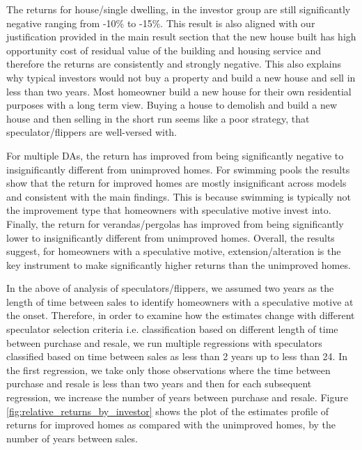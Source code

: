 \documentclass[AEJ,reqno, draftmode]{AEA} %
\begin{document}
The returns for house/single dwelling, in the investor group are still significantly negative ranging from -10\% to -15\%. This result is also aligned with our justification provided in the main result section that the new house built has high opportunity cost of residual value of the building and housing service and therefore the returns are consistently and strongly negative. This also explains why typical investors would not buy a property and build a new house and sell in less than two years. Most homeowner build a new house for their own residential purposes with a long term view. Buying a house to demolish and build a new house and then selling in the short run seems like a poor strategy, that speculator/flippers are well-versed with.

For multiple DAs, the return has improved from being significantly negative to insignificantly different from unimproved homes. For swimming pools the results show that the return for improved homes are mostly insignificant across models and consistent with the main findings. This is because swimming is typically not the improvement type that homeowners with speculative motive invest into. Finally, the return for verandas/pergolas has improved from being significantly lower to insignificantly different from unimproved homes. Overall, the results suggest, for homeowners with a speculative motive, extension/alteration is the key instrument to make significantly higher returns than the unimproved homes.

In the above of analysis of speculators/flippers, we assumed two years as the length of time between sales to identify homeowners with a speculative motive at the onset. Therefore, in order to examine how the estimates change with different speculator selection criteria i.e. classification based on different length of time between purchase and resale, we run multiple regressions with speculators classified based on time between sales as less than 2 years up to less than 24. In the first regression, we take only those observations where the time between purchase and resale is less than two years and then for each subsequent regression, we increase the number of years between purchase and resale. Figure \ref{fig:relative_returns_by_investor} shows the plot of the estimates profile of returns for improved homes as compared with the unimproved homes, by the number of years between sales.
\end{document}

